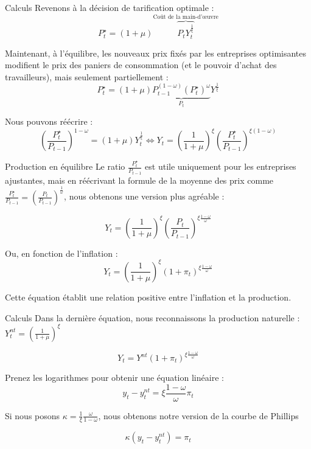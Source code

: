 \documentclass[
  ignorenonframetext,
  aspectratio=169,
]{beamer}
\begin{document}
\begin{frame}{Calculs}
\label{calculs}
Revenons à la décision de tarification optimale :
\[P^{\star}_t = (1+\mu) \overbrace{P_t Y_t^{\frac{1}{\xi}}}^{\text{Coût de la main-d'œuvre}}\]

Maintenant, à l'équilibre, les nouveaux prix fixés par les entreprises
optimisantes modifient le prix des paniers de consommation (et le
pouvoir d'achat des travailleurs), mais seulement partiellement :
\[P^{\star}_t = (1+\mu) {\underbrace{P_{t-1}^{(1-\omega)}(P^{\star}_t)^{\omega}}_{P_t}  Y^{\frac{1}{\xi}}}\]

Nous pouvons réécrire :
\[\left(\frac{P^{\star}_t}{P_{t-1}}\right)^{1-\omega} = (1+\mu) Y_t^{\frac{1}{\xi}} \Leftrightarrow Y_t = \left(\frac{1}{1+\mu}\right)^{\xi}\left(\frac{P^{\star}_t}{P_{t-1}}\right)^{\xi (1-\omega)}\]
\end{frame}

\begin{frame}{Production en équilibre}
\label{production-en-uxe9quilibre}
Le ratio \(\frac{P^{\star}_t}{P_{t-1}}\) est utile uniquement pour les
entreprises ajustantes, mais en réécrivant la formule de la moyenne des
prix comme
\(\frac{P^{\star}_t}{P_{t-1}}=\left(\frac{P_t}{P_{t-1}}\right)^{\frac{1}{\omega}}\),
nous obtenons une version plus agréable :

\[Y_t = \left(\frac{1}{1+\mu}\right)^{\xi}\left(\frac{P_t}{P_{t-1}} \right)^{\xi\frac{1-\omega}{\omega}}\]

Ou, en fonction de l'inflation :
\[\boxed{Y_t = \left(\frac{1}{1+\mu}\right)^{\xi}\left(1+\pi_t \right)^{
  \xi\frac{1-\omega}{\omega}}
}\]

Cette équation établit une relation positive entre l'inflation et la
production.
\end{frame}

\begin{frame}{Calculs}
\label{calculs-1}
Dans la dernière équation, nous reconnaissons la production naturelle :
\(Y_t^{nt} =\left( \frac{1}{1+\mu} \right)^{\xi}\)

\[Y_t = Y^{nt} \left(1+\pi_t \right)^{
  \xi\frac{1-\omega}{\omega}}
\]

Prenez les logarithmes pour obtenir une équation linéaire :
\[y_t - y^{nt}_t= \xi \frac{1-\omega}{\omega} \pi_t\]

Si nous posons \(\kappa = \frac{1}{\xi}\frac{\omega}{1-\omega}\), nous
obtenons notre version de la courbe de Phillips

\[\boxed{\kappa (y_t-y^{nt}_t) = \pi_t}\]
\end{frame}
\end{document}
